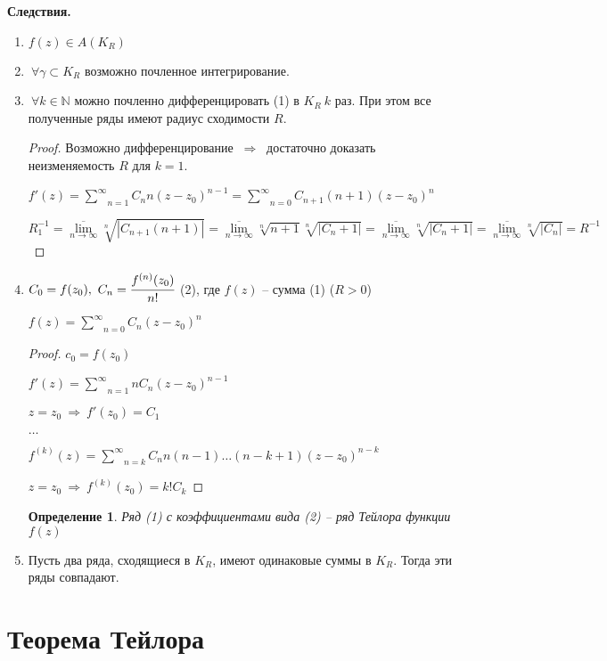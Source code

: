 \documentclass[draft]{article}
\newcommand{\then}{\ \Rightarrow\ }
\newcommand{\N}{\mathbb{N}}
\newcommand{\msum}[2]{\underset{#1}{\overset{#2}{\sum}}}
\newcommand{\rsum}{\msum{n=1}{\infty}}
\newcommand{\ssum}{\msum{n=0}{\infty}}
\newcommand{\mlim}[1]{\underset{#1}{\lim}}
\newcommand{\g}{\gamma}
\newcommand{\F}{\ \forall}
\newcommand{\opr}[1]{\begin{opred}#1\end{opred}}
\newtheorem*{opred}{Определение}
\theoremstyle{remark}
\begin{document}
{\bfseries Следствия.}
\begin{enumerate}
\item $f(z)\in A(K_R)$
\item $\F\g\subset K_R$ возможно почленное интегрирование.
\item $\F k\in\N$ можно почленно дифференцировать (1) в $K_R\ k$ раз. При этом все полученные ряды имеют радиус сходимости $R$.
\begin{proof}
Возможно дифференцирование $\then$ достаточно доказать неизменяемость $R$ для $k=1$.

$f'(z)=\rsum C_n n(z-z_0)^{n-1}=\ssum C_{n+1}(n+1)(z-z_0)^n$

$R^{-1}_1=\overline{\mlim{n\to\infty}}\sqrt[n]{|C_{n+1}(n+1)|}=\overline{\mlim{n\to\infty}}\sqrt[n]{n+1}\sqrt[n]{|C_n+1|}=\overline{\mlim{n\to\infty}}\sqrt[n]{|C_n+1|}=\overline{\mlim{n\to\infty}}\sqrt[n]{|C_n|}=R^{-1}$
\end{proof}
\item $C_0=f(z_0),\ C_n=\cfrac{f^{(n)}(z_0)}{n!}$ (2), где $f(z)$ -- сумма (1) ($R>0$)

$f(z)=\ssum C_n(z-z_0)^n$
\begin{proof}
$c_0=f(z_0)$

$f'(z)=\rsum nC_n(z-z_0)^{n-1}$

$z=z_0\then f'(z_0)=C_1$

$\ldots$

$f^{(k)}(z)=\msum{n=k}{\infty}C_nn(n-1)\ldots(n-k+1)(z-z_0)^{n-k}$

$z=z_0\then f^{(k)}(z_0)=k!C_k$
\end{proof}
\opr{Ряд (1) с коэффициентами вида (2) -- ряд Тейлора функции $f(z)$}
\item Пусть два ряда, сходящиеся в $K_R$, имеют одинаковые суммы в $K_R$. Тогда эти ряды совпадают.
\end{enumerate}

\newpage

\section{Теорема Тейлора}
\end{document}
